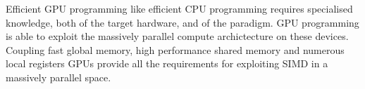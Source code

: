 
Efficient GPU programming like efficient CPU programming requires specialised knowledge, both of the
target hardware, and of the paradigm. GPU programming is able to exploit the massively parallel
compute archictecture on these devices. Coupling fast global memory, high performance shared memory
and numerous local registers GPUs provide all the requirements for exploiting SIMD in a massively
parallel space.




